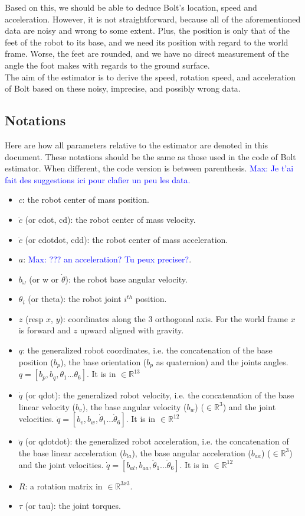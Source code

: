 \documentclass[a4paper,10pt]{article}
\newcommand{\mnaveau}[1]{\textcolor{blue}{Max: #1}}
\begin{document}
Based on this, we should be able to deduce Bolt's location, speed and acceleration. However, it is not straightforward, because all of the aforementioned data are noisy and wrong to some extent. Plus, the position is only that of the feet of the robot to its base, and we need its position with regard to the world frame. Worse, the feet are rounded, and we have no direct measurement of the angle the foot makes with regards to the ground surface.\\
The aim of the estimator is to derive the speed, rotation speed, and acceleration of Bolt based on these noisy, imprecise, and possibly wrong data.

\subsection{Notations}
Here are how all parameters relative to the estimator are denoted in this document. These notations should be the same as those used in the code of Bolt estimator. When different, the code version is between parenthesis.
\mnaveau{Je t'ai fait des suggestions ici pour clafier un peu les data.}
\begin{itemize}[noitemsep,topsep=0.5pt,parsep=0.1pt,partopsep=0.1pt]
	\item $c$: the robot center of mass position.
	\item $\dot c$ (or cdot, cd): the robot center of mass velocity.
	\item $\ddot c$ (or cdotdot, cdd): the robot center of mass acceleration.
	\item $a$: \mnaveau{??? an acceleration? Tu peux preciser?}.
	\item $b_\omega$ (or w or $\dot \theta$): the robot base angular velocity.
	\item $\theta_i$ (or theta): the robot joint $i^{th}$ position.
	\item $z$ (resp $x$, $y$): coordinates along the 3 orthogonal axis. For the world frame $x$ is forward and $z$ upward aligned with gravity.
	\item $q$: the generalized robot coordinates, i.e. the concatenation of the base position ($b_p$), the base orientation ($b_p$ as quaternion) and the joints angles. $q = [b_p, b_q, \theta_1 ... \theta_6]$. It is in $\in\mathbb{R}^{13}$
	\item $\dot q$ (or qdot): the generalized robot velocity, i.e. the concatenation of the base linear velocity ($b_v$), the base angular velocity ($b_w$) ($\in\mathbb{R}^3$) and the joint velocities. $\dot{q} = [b_v, b_w, \dot{\theta}_1 ... \dot{\theta}_6]$. It is in $\in\mathbb{R}^{12}$
	\item $\ddot q$ (or qdotdot): the generalized robot acceleration, i.e. the concatenation of the base linear acceleration ($b_{la}$), the base angular acceleration ($b_{aa}$) ($\in\mathbb{R}^3$) and the joint velocities. $\dot{q} = [b_{al}, b_{aa}, \ddot{\theta}_1 ... \ddot{\theta}_6]$. It is in $\in\mathbb{R}^{12}$
	\item $R$: a rotation matrix in $\in\mathbb{R}^{3x3}$.
	\item $\tau$ (or tau): the joint torques.
\end{itemize}
\end{document}
